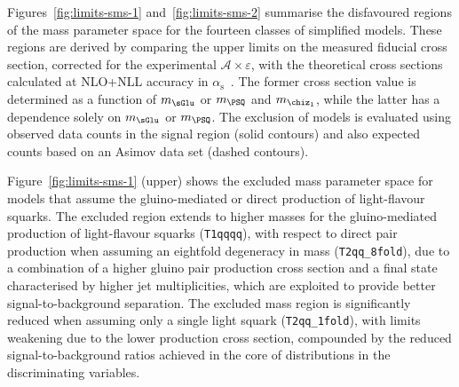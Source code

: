 Figures~\ref{fig:limits-sms-1} and~\ref{fig:limits-sms-2} summarise
the disfavoured regions of the mass parameter space for the fourteen
classes of simplified models. These regions are derived by comparing
the upper limits on the measured fiducial cross section, corrected for
the experimental $\mathcal{A}\times\varepsilon$, with the theoretical cross
sections calculated at NLO+NLL accuracy in
$\alpha_\text{s}$~\cite{susynlo}. The former cross section value is
determined as a function of $m_{\sGlu}$ or $m_{\PSQ}$ and
$m_{\chiz_1}$, while the latter has a dependence solely on $m_{\sGlu}$
or $m_{\PSQ}$.
The exclusion of models is evaluated using observed data counts in the
signal region (solid contours) and also expected counts based on an
Asimov data set (dashed contours).

Figure~\ref{fig:limits-sms-1} (upper) shows the excluded mass parameter
space for models that assume the gluino-mediated or direct production
of light-flavour squarks. The excluded region extends to higher masses
for the gluino-mediated production of light-flavour squarks
(\texttt{T1qqqq}), with respect to direct pair production when
assuming an eightfold degeneracy in mass (\texttt{T2qq\_8fold}), due
to a combination of a higher gluino pair production cross section and
a final state characterised by higher jet multiplicities, which are
exploited to provide better signal-to-background separation. The
excluded mass region is significantly reduced when assuming only a
single light squark (\texttt{T2qq\_1fold}), with limits weakening due
to the lower production cross section, compounded by the reduced
signal-to-background ratios achieved in the core of distributions in
the discriminating variables.

